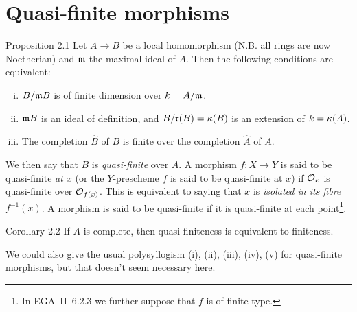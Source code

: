 \section{Quasi-finite morphisms}
\label{I.2}

\begin{itenv}{Proposition 2.1}
  Let $A\to B$ be a local homomorphism (N.B. all rings are now Noetherian) and $\frak{m}$ the maximal ideal of $A$.
  Then the following conditions are equivalent:
  \begin{enumerate}[(i)]
    \item $B/\frak{m}B$ is of finite dimension over $k=A/\frak{m}$.
    \item $\frak{m}B$ is an ideal of definition, and $B/\frak{r}(B)=\kres(B)$ is an extension of $k=\kres(A)$.
    \item The completion $\widehat{B}$ of $B$ is finite over the completion $\widehat{A}$ of $A$.
  \end{enumerate}
\end{itenv}

We then say that $B$ is \emph{quasi-finite} over $A$.
A morphism $f\colon X\to Y$ is said to be quasi-finite \emph{at $x$} (or the $Y$-prescheme $f$ is said to be quasi-finite at $x$) if $\cal{O}_x$ is quasi-finite over $\cal{O}_{f(x)}$.
This is equivalent to saying that $x$ is \emph{isolated in its fibre $f^{-1}(x)$}.
A morphism is said to be quasi-finite if it is quasi-finite at each point\footnote{In EGA~II~6.2.3 we further suppose that $f$ is of finite type.}.

\begin{itenv}{Corollary 2.2}
    If $A$ is complete, then quasi-finiteness is equivalent to finiteness.
\end{itenv}

We could also give the usual polysyllogism (i), (ii), (iii), (iv), (v) for quasi-finite morphisms, but that doesn't seem necessary here.
